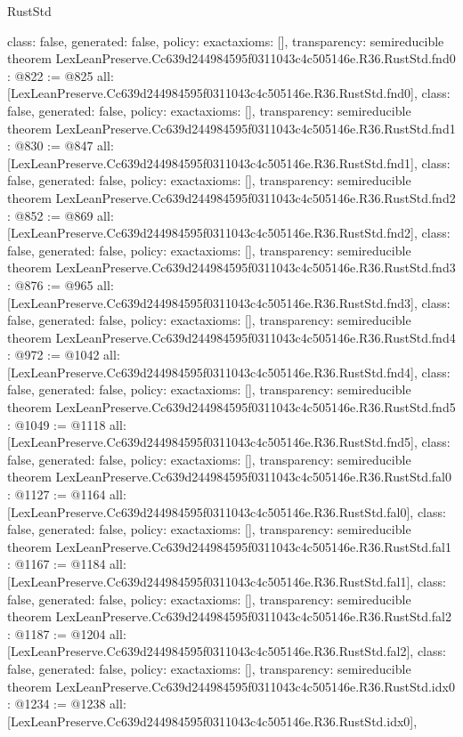\begin{lexlean}{RustStd}
\begin{coremodule}
{  class: false,
  generated: false,
  policy: exact{axioms: []},
  transparency: semireducible
}
theorem LexLeanPreserve.Cc639d244984595f0311043c4c505146e.R36.RustStd.fnd0 : @822 := @825 {
  all: [LexLeanPreserve.Cc639d244984595f0311043c4c505146e.R36.RustStd.fnd0],
  class: false,
  generated: false,
  policy: exact{axioms: []},
  transparency: semireducible
}
theorem LexLeanPreserve.Cc639d244984595f0311043c4c505146e.R36.RustStd.fnd1 : @830 := @847 {
  all: [LexLeanPreserve.Cc639d244984595f0311043c4c505146e.R36.RustStd.fnd1],
  class: false,
  generated: false,
  policy: exact{axioms: []},
  transparency: semireducible
}
theorem LexLeanPreserve.Cc639d244984595f0311043c4c505146e.R36.RustStd.fnd2 : @852 := @869 {
  all: [LexLeanPreserve.Cc639d244984595f0311043c4c505146e.R36.RustStd.fnd2],
  class: false,
  generated: false,
  policy: exact{axioms: []},
  transparency: semireducible
}
theorem LexLeanPreserve.Cc639d244984595f0311043c4c505146e.R36.RustStd.fnd3 : @876 := @965 {
  all: [LexLeanPreserve.Cc639d244984595f0311043c4c505146e.R36.RustStd.fnd3],
  class: false,
  generated: false,
  policy: exact{axioms: []},
  transparency: semireducible
}
theorem LexLeanPreserve.Cc639d244984595f0311043c4c505146e.R36.RustStd.fnd4 : @972 := @1042 {
  all: [LexLeanPreserve.Cc639d244984595f0311043c4c505146e.R36.RustStd.fnd4],
  class: false,
  generated: false,
  policy: exact{axioms: []},
  transparency: semireducible
}
theorem LexLeanPreserve.Cc639d244984595f0311043c4c505146e.R36.RustStd.fnd5 : @1049 := @1118 {
  all: [LexLeanPreserve.Cc639d244984595f0311043c4c505146e.R36.RustStd.fnd5],
  class: false,
  generated: false,
  policy: exact{axioms: []},
  transparency: semireducible
}
theorem LexLeanPreserve.Cc639d244984595f0311043c4c505146e.R36.RustStd.fal0 : @1127 := @1164 {
  all: [LexLeanPreserve.Cc639d244984595f0311043c4c505146e.R36.RustStd.fal0],
  class: false,
  generated: false,
  policy: exact{axioms: []},
  transparency: semireducible
}
theorem LexLeanPreserve.Cc639d244984595f0311043c4c505146e.R36.RustStd.fal1 : @1167 := @1184 {
  all: [LexLeanPreserve.Cc639d244984595f0311043c4c505146e.R36.RustStd.fal1],
  class: false,
  generated: false,
  policy: exact{axioms: []},
  transparency: semireducible
}
theorem LexLeanPreserve.Cc639d244984595f0311043c4c505146e.R36.RustStd.fal2 : @1187 := @1204 {
  all: [LexLeanPreserve.Cc639d244984595f0311043c4c505146e.R36.RustStd.fal2],
  class: false,
  generated: false,
  policy: exact{axioms: []},
  transparency: semireducible
}
theorem LexLeanPreserve.Cc639d244984595f0311043c4c505146e.R36.RustStd.idx0 : @1234 := @1238 {
  all: [LexLeanPreserve.Cc639d244984595f0311043c4c505146e.R36.RustStd.idx0],
}
\end{coremodule}
\end{lexlean}
